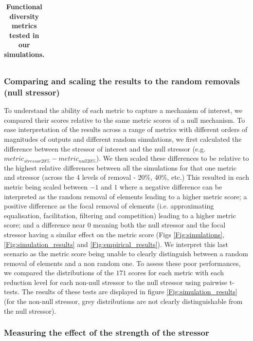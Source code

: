 \documentclass[12pt,letterpaper]{article}
\begin{document}
\begin{table}
\begin{tabular}{p{0.1\linewidth}|p{0.15\linewidth}|p{0.15\linewidth}|p{0.2\linewidth}|p{0.15\linewidth}|p{0.1\linewidth}}
\end{tabular}
\caption{\scriptsize{\textbf{Functional diversity metrics tested in our simulations.}}
}
\label{Tab:metrics}
\end{table}

\subsubsection{Comparing and scaling the results to the random removals (null stressor)}

To understand the ability of each metric to capture a mechanism of interest, we compared their scores relative to the same metric scores of a null mechanism.
To ease interpretation of the results across a range of metrics with different orders of magnitudes of outputs and different random simulations, we first calculated the difference between the stressor of interest and the null stressor (e.g. $metric_{stressor20\%} - metric_{null20\%}$).
We then scaled these differences to be relative to the highest relative differences between all the simulations for that one metric and stressor (across the 4 levels of removal - 20\%, 40\%, etc.)
This resulted in each metric being scaled between $-1$ and $1$ where a negative difference can be interpreted as the random removal of elements leading to a higher metric score; a positive difference as the focal removal of elements (i.e. approximating equalisation, facilitation, filtering and competition) leading to a higher metric score; and a difference near $0$ meaning both the null stressor and the focal stressor having a similar effect on the metric score (Figs \ref{Fig:simulations}, \ref{Fig:simulation_results} and \ref{Fig:empirical_results}).
We interpret this last scenario as the metric score being unable to clearly distinguish between a random removal of elements and a non random one.
To assess these poor performances, we compared the distributions of the $171$ scores for each metric with each reduction level for each non-null stressor to the null stressor using pairwise t-tests.
The results of these tests are displayed in figure \ref{Fig:simulation_results} (for the non-null stressor, grey distributions are not clearly distinguishable from the null stressor).

\subsubsection{Measuring the effect of the strength of the stressor}
\end{document}
